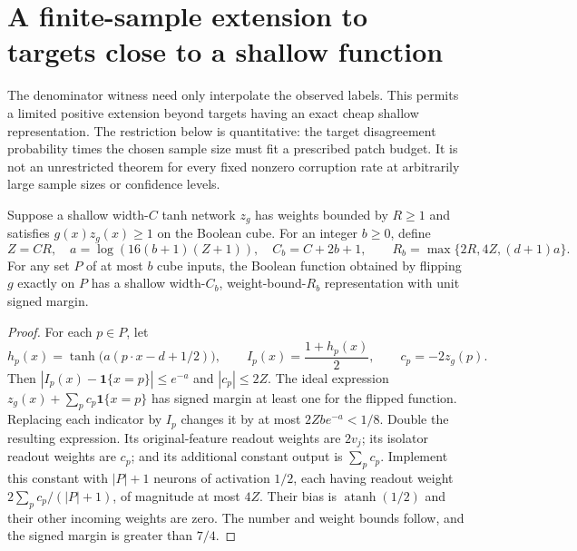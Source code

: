 \section{A finite-sample extension to targets close to a shallow function}
\label{sec:unrestricted-target-corruption}

The denominator witness need only interpolate the observed labels. This
permits a limited positive extension beyond targets having an exact cheap
shallow representation. The restriction below is quantitative: the target
disagreement probability times the chosen sample size must fit a prescribed
patch budget. It is not an unrestricted theorem for every fixed nonzero
corruption rate at arbitrarily large sample sizes or confidence levels.

\begin{lemma}
\label{lem:shallow-point-patching}
Suppose a shallow width-$C$ tanh network $z_g$ has weights bounded by
$R\ge1$ and satisfies $g(x)z_g(x)\ge1$ on the Boolean cube.
For an integer $b\ge0$, define
\[
 Z=CR,\quad a=\log(16(b+1)(Z+1)),\quad
 C_b=C+2b+1,\qquad R_b=\max\{2R,4Z,(d+1)a\}.
\]
For any set $P$ of at most $b$ cube inputs, the Boolean function obtained
by flipping $g$ exactly on $P$ has a shallow width-$C_b$, weight-bound-$R_b$
representation with unit signed margin.
\end{lemma}

\begin{proof}
For each $p\in P$, let
\[
 h_p(x)=\tanh\bigl(a(p\cdot x-d+1/2)\bigr),\qquad
 I_p(x)=\frac{1+h_p(x)}2,\qquad c_p=-2z_g(p).
\]
Then $|I_p(x)-\mathbf1\{x=p\}|\le e^{-a}$ and $|c_p|\le2Z$.
The ideal expression $z_g(x)+\sum_pc_p\mathbf1\{x=p\}$ has signed
margin at least one for the flipped function. Replacing each indicator
by $I_p$ changes it by at most $2Zb e^{-a}<1/8$.
Double the resulting expression. Its original-feature readout weights
are $2v_j$; its isolator readout weights are $c_p$; and its additional
constant output is $\sum_pc_p$.
Implement this constant with $|P|+1$ neurons of activation $1/2$, each
having readout weight $2\sum_pc_p/(|P|+1)$, of magnitude at most $4Z$.
Their bias is $\operatorname{atanh}(1/2)$ and their other incoming
weights are zero. The number and weight bounds follow, and the signed
margin is greater than $7/4$.
\end{proof}

